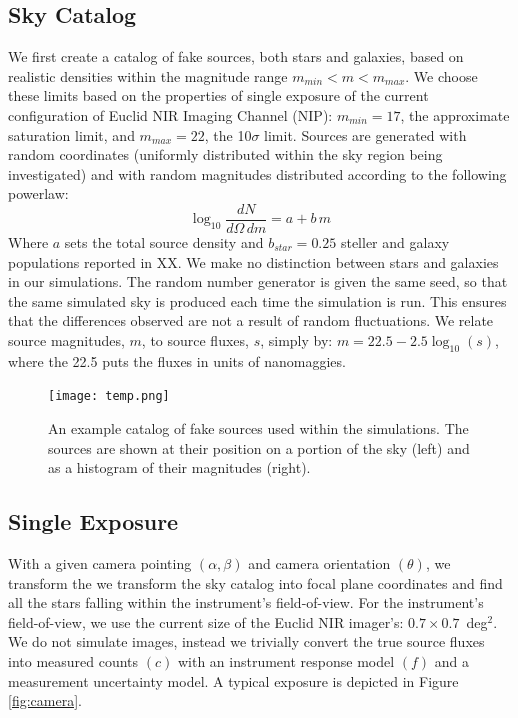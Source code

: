 \documentclass[manuscript]{aastex}
\begin{document}
\subsection{Sky Catalog}
We first create a catalog of fake sources, both stars and galaxies, based on realistic densities within the magnitude range $m_{min} < m < m_{max}$. We choose these limits based on the properties of single exposure of the current configuration of Euclid NIR Imaging Channel (NIP): $m_{min} = 17$, the approximate saturation limit, and $m_{max} = 22$, the 10$\sigma$ limit. Sources are generated with random coordinates (uniformly distributed within the sky region being investigated) and with random magnitudes distributed according to the following powerlaw:
\begin{displaymath}
\log_{10} \frac{dN}{d\Omega\,dm} = a + b\,m
\end{displaymath}
Where $a$ sets the total source density and $b_{star} = 0.25$ steller and galaxy populations reported in XX. We make no distinction between stars and galaxies in our simulations. The random number generator is given the same seed, so that the same simulated sky is produced each time the simulation is run. This ensures that the differences observed are not a result of random fluctuations. We relate source magnitudes, $m$, to source fluxes, $s$, simply by: $m = 22.5 - 2.5\log_{10}(s)$, where the 22.5 puts the fluxes in units of nanomaggies. 

\begin{figure}[ht]
\begin{center}
\texttt{[image: temp.png]}
\end{center}
\caption{An example catalog of fake sources used within the simulations. The sources are shown at their position on a portion of the sky (left) and as a histogram of their magnitudes (right).
\label{fig:sky}}
\end{figure}

\subsection{Single Exposure}
With a given camera pointing $(\alpha, \beta)$ and camera orientation $(\theta)$, we transform the we transform the sky catalog into focal plane coordinates and find all the stars falling within the instrument's field-of-view. For the instrument's field-of-view, we use the current size of the Euclid NIR imager's: $0.7 \times 0.7$~deg$^{2}$. We do not simulate images, instead we trivially convert the true source fluxes into measured counts $(c)$ with an instrument response model $(f)$ and a measurement uncertainty model. A typical exposure is depicted in Figure \ref{fig:camera}.
\end{document}
